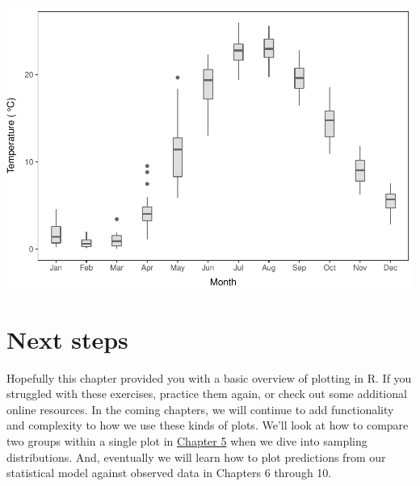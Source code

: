 \documentclass[
]{book}
\begin{document}
\includegraphics{worstr_files/figure-latex/unnamed-chunk-113-1.pdf}

\hypertarget{next-steps}{%
\section{Next steps}\label{next-steps}}

Hopefully this chapter provided you with a basic overview of plotting in R. If you struggled with these exercises, practice them again, or check out some additional online resources. In the coming chapters, we will continue to add functionality and complexity to how we use these kinds of plots. We'll look at how to compare two groups within a single plot in \protect\hyperlink{Chapter5}{Chapter 5} when we dive into sampling distributions. And, eventually we will learn how to plot predictions from our statistical model against observed data in Chapters 6 through 10.

  
\end{document}
